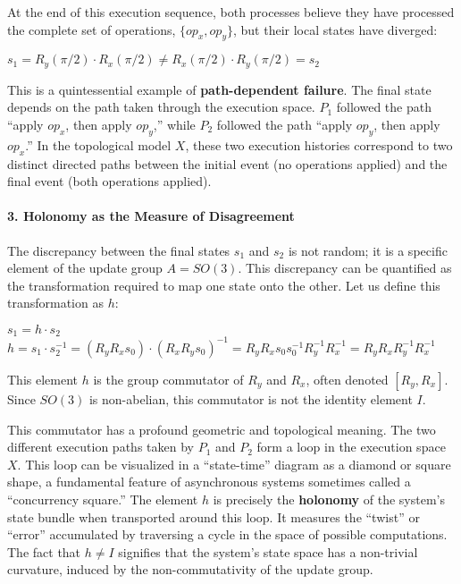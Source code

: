 \documentclass[
]{article}
\begin{document}
At the end of this execution sequence, both processes believe they have
processed the complete set of operations, \(\{op_x, op_y\}\), but their
local states have diverged:

\(s_1 = R_y(\pi/2) \cdot R_x(\pi/2) \neq R_x(\pi/2) \cdot R_y(\pi/2) = s_2\)

This is a quintessential example of \textbf{path-dependent failure}. The
final state depends on the path taken through the execution space.
\(P_1\) followed the path ``apply \(op_x\), then apply \(op_y\),'' while
\(P_2\) followed the path ``apply \(op_y\), then apply \(op_x\).'' In
the topological model \(X\), these two execution histories correspond to
two distinct directed paths between the initial event (no operations
applied) and the final event (both operations applied).

\paragraph{3. Holonomy as the Measure of
Disagreement}\label{holonomy-as-the-measure-of-disagreement}

The discrepancy between the final states \(s_1\) and \(s_2\) is not
random; it is a specific element of the update group \(A=SO(3)\). This
discrepancy can be quantified as the transformation required to map one
state onto the other. Let us define this transformation as \(h\):

\(s_1 = h \cdot s_2\)
\(h = s_1 \cdot s_2^{-1} = (R_y R_x s_0) \cdot (R_x R_y s_0)^{-1} = R_y R_x s_0 s_0^{-1} R_y^{-1} R_x^{-1} = R_y R_x R_y^{-1} R_x^{-1}\)

This element \(h\) is the group commutator of \(R_y\) and \(R_x\), often
denoted \([R_y, R_x]\). Since \(SO(3)\) is non-abelian, this commutator
is not the identity element \(I\).

This commutator has a profound geometric and topological meaning. The
two different execution paths taken by \(P_1\) and \(P_2\) form a loop
in the execution space \(X\). This loop can be visualized in a
``state-time'' diagram as a diamond or square shape, a fundamental
feature of asynchronous systems sometimes called a ``concurrency
square.'' The element \(h\) is precisely the \textbf{holonomy} of the
system's state bundle when transported around this loop. It measures the
``twist'' or ``error'' accumulated by traversing a cycle in the space of
possible computations. The fact that \(h \neq I\) signifies that the
system's state space has a non-trivial curvature, induced by the
non-commutativity of the update group.
\end{document}
